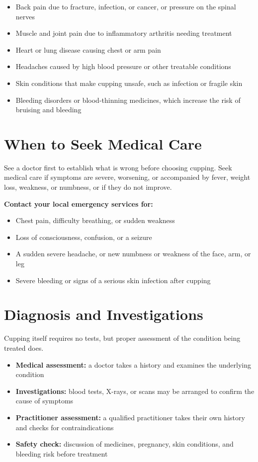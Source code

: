 \begin{itemize}
    \item Back pain due to fracture, infection, or cancer, or pressure on the spinal nerves
    \item Muscle and joint pain due to inflammatory arthritis needing treatment
    \item Heart or lung disease causing chest or arm pain
    \item Headaches caused by high blood pressure or other treatable conditions
    \item Skin conditions that make cupping unsafe, such as infection or fragile skin
    \item Bleeding disorders or blood-thinning medicines, which increase the risk of bruising and bleeding
\end{itemize}

\section*{When to Seek Medical Care}
See a doctor first to establish what is wrong before choosing cupping. Seek medical care if symptoms are severe, worsening, or accompanied by fever, weight loss, weakness, or numbness, or if they do not improve.

\textbf{Contact your local emergency services for:}
\begin{itemize}
    \item Chest pain, difficulty breathing, or sudden weakness
    \item Loss of consciousness, confusion, or a seizure
    \item A sudden severe headache, or new numbness or weakness of the face, arm, or leg
    \item Severe bleeding or signs of a serious skin infection after cupping
\end{itemize}

\section*{Diagnosis and Investigations}
Cupping itself requires no tests, but proper assessment of the condition being treated does.

\begin{itemize}
    \item \textbf{Medical assessment:} a doctor takes a history and examines the underlying condition
    \item \textbf{Investigations:} blood tests, X-rays, or scans may be arranged to confirm the cause of symptoms
    \item \textbf{Practitioner assessment:} a qualified practitioner takes their own history and checks for contraindications
    \item \textbf{Safety check:} discussion of medicines, pregnancy, skin conditions, and bleeding risk before treatment
\end{itemize}

